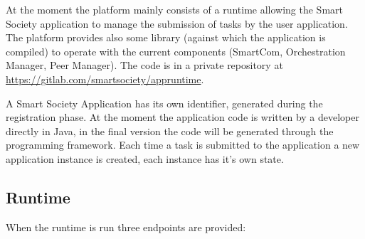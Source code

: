 At the moment the platform mainly consists of a runtime allowing the Smart Society application to manage the submission of tasks by the user application. The platform provides also some library (against which the application is compiled) to operate with the current components (SmartCom, Orchestration Manager, Peer Manager). The code is in a private repository at \url{https://gitlab.com/smartsociety/appruntime}.%

A Smart Society Application has its own identifier, generated during the registration phase. At the moment the application code is written by a developer directly in Java, in the final version the code will be generated through the programming framework. Each time a task is submitted to the application a new application instance is created, each instance has it's own state.

\subsection{Runtime}

When the runtime is run three endpoints are provided: 

